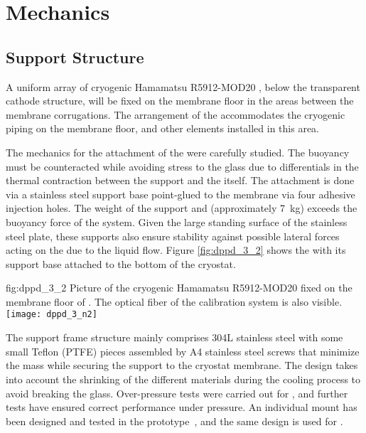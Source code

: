 \section{Mechanics}
\label{sec:dp-pds-mechanics}

\subsection{ Support Structure}
\label{subsec:dp-pds-mechanics-pmtsupport}

A uniform array of \dpnumpmtch cryogenic Hamamatsu R5912-MOD20 , below the transparent cathode structure, will be fixed on the membrane floor in the areas between the membrane corrugations. The arrangement of the  accommodates the cryogenic piping on the membrane floor, and other elements installed in this area.

The mechanics for the attachment of the  were carefully studied. The  buoyancy must be counteracted while avoiding stress to the  glass due to differentials in the thermal contraction between the support and the  itself. The attachment is done via a stainless steel support base point-glued to the membrane via four adhesive injection holes. The weight of the support and  (approximately \SI{7}{\kg}) exceeds the buoyancy force of the system. Given the large standing surface of the stainless steel plate, these supports also ensure stability against possible lateral forces acting on the  due to the liquid flow. Figure \ref{fig:dppd_3_2} shows the  with its support base attached to the bottom of the  cryostat.

\begin{dunefigure}{fig:dppd_3_2}
{Picture of the cryogenic Hamamatsu R5912-MOD20  fixed on the membrane floor of . The optical fiber of the calibration system is also visible.}
\texttt{[image: dppd\_3\_n2]}
\end{dunefigure}

The support frame structure mainly comprises \num{304}L stainless steel with some small Teflon (PTFE) pieces assembled by A4 stainless steel screws that minimize the mass while securing the  support to the cryostat membrane. The design %
takes into account the shrinking of the different materials during the cooling process to avoid breaking the  glass.
Over-pressure tests were carried out for , and further tests have ensured correct performance under pressure. An individual  mount has been designed and tested in the   prototype~\cite{Zambelli:2017dkg}, and the same design is used for .

